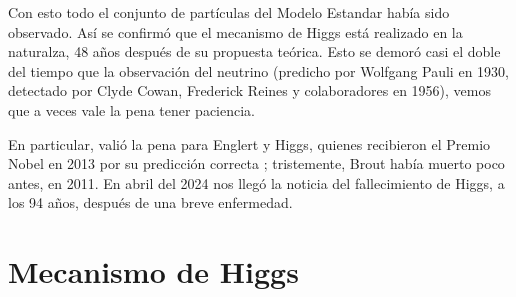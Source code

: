 \documentclass[12pt]{article}
\begin{document}
Con esto todo el conjunto de part\'iculas del Modelo Estandar
había sido observado. As\'i se confirm\'o que el mecanismo de Higgs
est\'a realizado en la naturalza, 48 a\~nos despu\'es de su
propuesta te\'orica. Esto se demor\'o casi el doble del tiempo
que la observaci\'on del neutrino (predicho por Wolfgang Pauli en 1930,
detectado por Clyde Cowan, Frederick Reines y colaboradores en
1956), vemos que a veces vale la pena tener paciencia.

En particular, valió la pena para Englert y Higgs, quienes recibieron
el Premio Nobel en 2013 por su predicci\'on correcta \cite{Nobel13};
tristemente, Brout hab\'ia muerto poco antes, en 2011.
En abril del 2024 nos lleg\'o la noticia del fallecimiento de Higgs,
a los 94 a\~nos, despu\'es de una breve enfermedad.

\section{Mecanismo de Higgs}


\end{document}
